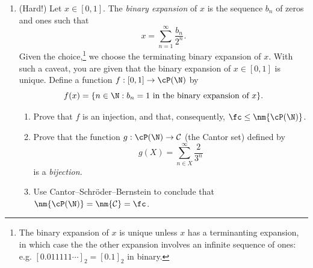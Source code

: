 \begin{enumerate}
  		
	\item (Hard!) Let $x\in[0,1]$. The \emph{binary expansion} of $x$ is the sequence $b_n$ of zeros and ones such that
  \[x=\sum_{n=1}^\infty \frac{b_n}{2^n}.\]
  Given the choice,\footnote{The binary expansion of $x$ is unique unless $x$ has a terminanting expansion, in which case the the other expansion involves an infinite sequence of ones: e.g. $[0.011111\cdots]_2=[0.1]_2$ in binary.} we choose the terminating binary expansion of $x$. With such a caveat, you are given that the binary expansion of $x\in[0,1]$ is unique. Define a function $f:[0,1]\to\cP(\N)$ by
  \[f(x)=\{n\in\N:b_n=1\text{ in the binary expansion of $x$}\}.\]
  \begin{enumerate}
    \item Prove that $f$ is an injection, and that, consequently, $\fc\le\nm{\cP(\N)}$.
		\item Prove that the function $g:\cP(\N)\to\mathcal C$ (the Cantor set) defined by
		\[g(X)=\sum\limits_{n\in X}^\infty\frac{2}{3^n}\]
		is a \emph{bijection.}
		\item Use Cantor--Schr\"oder--Bernstein to conclude that $\nm{\cP(\N)}=\nm{\mathcal C}=\fc$.
	\end{enumerate}
\end{enumerate}
